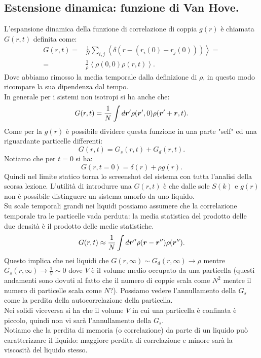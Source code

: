 \subsection{Estensione dinamica: funzione di Van Hove.}
\label{subsec:Estensione dinamica}
L'espansione dinamica della funzione di correlazione di coppia $g(r)$ è chiamata $G(r,t)$ definita come:
\[\begin{aligned}
	G(r,t) 
	=&
	\frac{1}{N}\sum_{i,j}^{} \left<\delta(r-(r_i(0)-r_j(0))) \right>=\\
	=&
	\frac{1}{\rho }\left<\rho (0,0)\rho (r,t) \right>
.\end{aligned}\]
Dove abbiamo rimosso la media temporale dalla definizione di $\rho $, in questo modo ricompare la sua dipendenza dal tempo.\\
In generale per i sistemi non isotropi si ha anche che:
\[
	G(r,t) = \frac{1}{N}\int d\boldsymbol{r}'\rho (\boldsymbol{r}',0)\rho (\boldsymbol{r}'+\boldsymbol{r},t)
.\] 
Come per la $g(r)$ è possibile dividere questa funzione in una parte "self" ed una riguardante particelle differenti:
\[
	G(r,t) = G_s(r,t) + G_d(r,t)
.\] 
Notiamo che per $t=0$ si ha:
\[
	G(r,t=0)=\delta(r)+\rho g(r)
.\] 
Quindi nel limite statico torna lo screenshot del sistema con tutta l'analisi della scorsa lezione. L'utilità di introdurre una $G(r,t)$ è che dalle sole $S(k)$ e $g(r)$ non è possibile distinguere un sistema amorfo da uno liquido.\\
Su scale temporali grandi nei liquidi possiamo assumere che la correlazione temporale tra le particelle vada perduta: la media statistica del prodotto delle due densità è il prodotto delle medie statistiche.
\[
	G(r,t) \approx \frac{1}{N}\int d\boldsymbol{r}'' \rho (\boldsymbol{r}-\boldsymbol{r}'')\rho (\boldsymbol{r}'')
.\] 
Questo implica che nei liquidi che $G(r,\infty)\sim G_d(r,\infty) \to \rho$ mentre $G_s(r,\infty)\to \frac{1}{V} \sim 0$ dove $V$ è il volume medio occupato da una particella (questi andamenti sono dovuti al fatto che il numero di coppie scala come $N^2$ mentre il numero di particelle scala come $N$?). Possiamo vedere l'annullamento della $G_s$ come la perdita della autocorrelazione della particella.\\
Nei solidi viceversa si ha che il volume $V$ in cui una particella è confinata è piccolo, quindi non vi sarà l'annullamento della $G_s$.\\
Notiamo che la perdita di memoria (o correlazione) da parte di un liquido può caratterizzare il liquido: maggiore perdita di correlazione e minore sarà la viscosità del liquido stesso.
